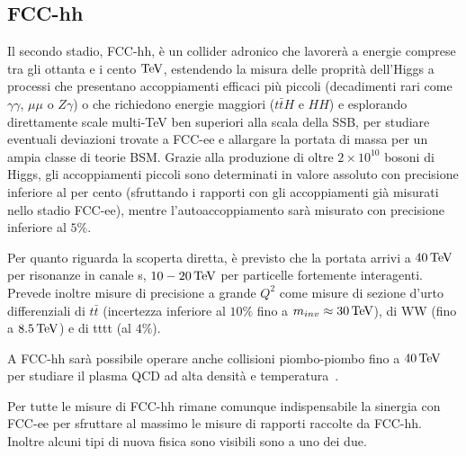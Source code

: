 \subsection{FCC-hh}
Il secondo stadio, FCC-hh, è un collider adronico che lavorerà a energie comprese tra gli ottanta e i cento $\mathrm{TeV}$, estendendo la misura delle proprità dell'Higgs a processi che presentano accoppiamenti efficaci più piccoli (decadimenti rari come $\gamma\gamma$, $\mu\mu$ o $Z\gamma$) o che richiedono energie maggiori ($t\bar tH$ e $HH$) e esplorando direttamente scale multi-TeV ben superiori alla scala della SSB, per studiare eventuali deviazioni trovate a FCC-ee e allargare la portata di massa per un ampia classe di teorie BSM. Grazie alla produzione di oltre $2\times10^{10}$ bosoni di Higgs, gli accoppiamenti piccoli sono determinati in valore assoluto con precisione inferiore al per cento (sfruttando i rapporti con gli accoppiamenti già misurati nello stadio FCC-ee), mentre l'autoaccoppiamento sarà misurato con precisione inferiore al $5\%$. 

Per quanto riguarda la scoperta diretta, è previsto che la portata arrivi a $40\,\mathrm{TeV}$ per risonanze in canale s, $10-20\,\mathrm{TeV}$ per particelle fortemente interagenti. Prevede inoltre misure di precisione a grande $Q^2$ come misure di sezione d'urto differenziali di $t\bar t$ (incertezza inferiore al $10\%$ fino a $m_{inv}\approx30\,\mathrm{TeV}$), di WW (fino a $8.5\,\mathrm{TeV}$) e di tttt (al $4\%$). 

A FCC-hh sarà possibile operare anche collisioni piombo-piombo fino a $40\,\mathrm{TeV}$ per studiare il plasma QCD ad alta densità e temperatura~\cite{FCC:FSR-v1}.

Per tutte le misure di FCC-hh rimane comunque indispensabile la sinergia con FCC-ee per sfruttare al massimo le misure di rapporti raccolte da FCC-hh. Inoltre alcuni tipi di nuova fisica sono visibili sono a uno dei due.


